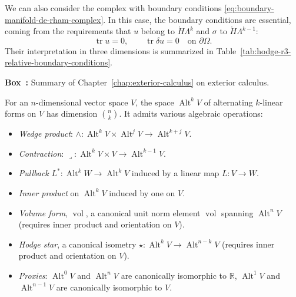 {We can also consider the complex with boundary conditions \eqref{eq:boundary-manifold-de-rham-complex}. In this case, the boundary conditions are essential, coming from the requirements that $u$ belong to $\mathring H\Lambda^k$ and $\sigma$ to $\mathring H\Lambda^{k-1}$:}
\[
\operatorname{tr}u=0,\qquad\operatorname{tr}\delta u=0\quad\text{on }\partial\Omega.
\]
{Their interpretation in three dimensions is summarized in Table~\ref{tab:hodge-r3-relative-boundary-conditions}.}

\begin{tcolorbox}[enhanced,breakable,colback=KuangNei,frame hidden,boxrule=0pt,sharpish corners,before skip=10pt,after skip=10pt]
\label{box:exterior-calculus-summary}
\noindent\textbf{Box~\thebooksummary:} {Summary of Chapter~\ref{chap:exterior-calculus} on exterior calculus.}\par

{For an $n$-dimensional vector space $V$, the space $\operatorname{Alt}^kV$ of alternating $k$-linear forms on $V$ has dimension $\binom nk$. It admits various algebraic operations:}
\begin{itemize}
\item{\emph{Wedge product}: $\wedge:\operatorname{Alt}^kV\times\operatorname{Alt}^jV\to\operatorname{Alt}^{k+j}V$.}
\item{\emph{Contraction}: $\lrcorner:\operatorname{Alt}^kV\times V\to\operatorname{Alt}^{k-1}V$.}
\item{\emph{Pullback} $L^*:\operatorname{Alt}^kW\to\operatorname{Alt}^kV$ induced by a linear map $L:V\to W$.}
\item{\emph{Inner product} on $\operatorname{Alt}^kV$ induced by one on $V$.}
\item{\emph{Volume form}, $\operatorname{vol}$, a canonical unit norm element $\operatorname{vol}$ spanning $\operatorname{Alt}^nV$ (requires inner product and orientation on $V$).}
\item{\emph{Hodge star}, a canonical isometry $\star:\operatorname{Alt}^kV\to\operatorname{Alt}^{n-k}V$ (requires inner product and orientation on $V$).}
\item{\emph{Proxies}: $\operatorname{Alt}^0V$ and $\operatorname{Alt}^nV$ are canonically isomorphic to $\mathbb R$, $\operatorname{Alt}^1V$ and $\operatorname{Alt}^{n-1}V$ are canonically isomorphic to $V$.}
\end{itemize}


\end{tcolorbox}

